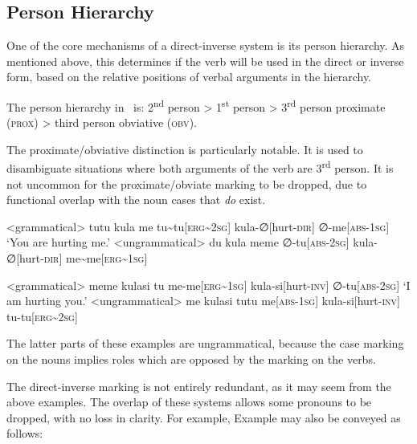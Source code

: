 \subsection{Person Hierarchy}\label{sec:person_hierarchy}
One of the core mechanisms of a direct-inverse system is its person hierarchy. As mentioned above, this determines if the verb will be used in the direct or inverse form, based on the relative positions of verbal arguments in the hierarchy.

The person hierarchy in \langname\ is: 2\textsuperscript{nd} person > 1\textsuperscript{st} person > 3\textsuperscript{rd} person proximate (\textsc{prox}) > third person obviative (\textsc{obv}).

The proximate/obviative distinction is particularly notable. It is used to disambiguate situations where both arguments of the verb are 3\textsuperscript{rd} person. It is not uncommon for the proximate/obviate marking to be dropped, due to functional overlap with the noun cases that \textit{do} exist.

\begin{paracol}{2}
\a<grammatical>
\begingl
\glpreamble tutu kula me
\endpreamble
tu\textasciitilde tu[\textsc{erg\textasciitilde 2sg}]
kula-∅[hurt-\textsc{dir}]
∅-me[\textsc{abs-1sg}]
\glft `You are hurting me.'
\endgl
\switchcolumn
\a<ungrammatical>
\begingl
\glpreamble \ljudge{*} du kula meme
\endpreamble
∅-tu[\textsc{abs-2sg}]
kula-∅[hurt-\textsc{dir}]
me\textasciitilde me[\textsc{erg\textasciitilde 1sg}]
\endgl
\end{paracol}
\xe


\begin{paracol}{2}
\a<grammatical>
\begingl
\glpreamble meme kulasi tu
\endpreamble
me-me[\textsc{erg\textasciitilde 1sg}]
kula-si[hurt-\textsc{inv}]
∅-tu[\textsc{abs-2sg}]
\glft `I am hurting you.'
\endgl
\switchcolumn
\a<ungrammatical>
\begingl
\glpreamble \ljudge{*} me kulasi tutu
\endpreamble
me[\textsc{abs-1sg}]
kula-si[hurt-\textsc{inv}]
tu-tu[\textsc{erg\textasciitilde 2sg}]
\endgl
\end{paracol}
\xe

The latter parts of these examples are ungrammatical, because the case marking on the nouns implies roles which are opposed by the marking on the verbs.

The direct-inverse marking is not entirely redundant, as it may seem from the above examples. The overlap of these systems allows some pronouns to be dropped, with no loss in clarity. For example, Example  may also be conveyed as follows:


